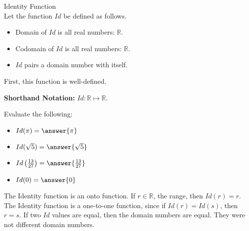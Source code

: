 \documentclass{ximera}
\begin{document}
\begin{example} Identity Function \\

Let the function $Id$ be defined as follows.


\begin{itemize}
\item Domain of $Id$ is all real numbers: $\mathbb{R}$.
\item Codomain of $Id$ is all real numbers: $\mathbb{R}$.
\item $Id$ pairs a domain number with itself.
\end{itemize}


First, this function is well-defined.


\textbf{Shorthand Notation: } $Id: \mathbb{R} \mapsto \mathbb{R}$.

\begin{question}
Evaluate the following:

\begin{itemize}
	\item $Id(\pi) = \answer{\pi}$
	\item $Id(\sqrt{5}) = \answer{\sqrt{5}}$
	\item $Id\left(\frac{13}{27}\right) = \answer{\frac{13}{27}}$
	\item $Id(0) = \answer{0}$
\end{itemize}

\end{question}





The Identity function is an onto function.  If $r \in \mathbb{R}$, the range, then $Id(r) = r$. \\


The Identity function is a one-to-one function, since if $Id(r)=Id(s)$, then $r = s$.  If two $Id$ values are equal, then the domain numbers are equal. They were not different domain numbers.





\end{example}
\end{document}
